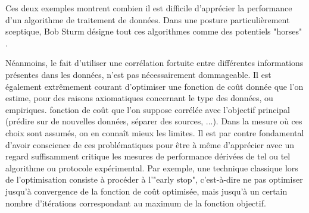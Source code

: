   Ces deux exemples montrent combien il est difficile d'apprécier la performance d'un algorithme de traitement de données. Dans une posture particulièrement sceptique, Bob Sturm désigne tout ces algorithmes comme des potentiels "horses"  .

  Néanmoins, le fait d'utiliser une corrélation fortuite entre différentes informations présentes dans les données, n'est pas nécessairement dommageable. Il est également extrêmement courant d'optimiser une fonction de coût donnée que l'on estime, pour des raisons axiomatiques concernant le type des données, ou empiriques. fonction de coût que l'on suppose corrélée avec l'objectif principal (prédire sur de nouvelles données, séparer des sources, ...). Dans la mesure où ces choix sont assumés, on en connaît mieux les limites. Il est par contre fondamental d'avoir conscience de ces problématiques pour être à même d'apprécier avec un regard suffisamment critique les mesures de performance dérivées de tel ou tel algorithme ou protocole expérimental\cite{lagrangehal-01635373}. Par exemple, une technique classique lors de l'optimisation consiste à procéder à l'"early stop", c'est-à-dire ne pas optimiser jusqu'à convergence de la fonction de coût optimisée, mais jusqu'à un certain nombre d'itérations correspondant au maximum de la fonction objectif.

